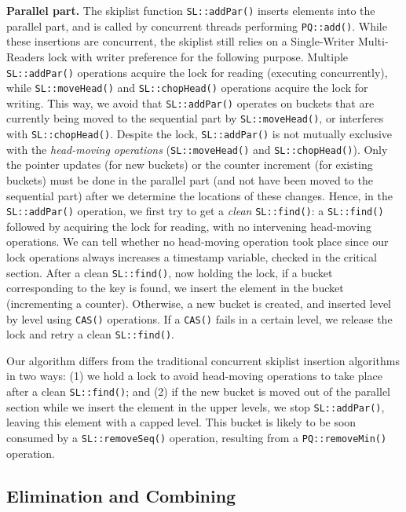 \textbf{Parallel part.} The skiplist function \texttt{SL::addPar()} inserts elements into the parallel part, and is called by concurrent threads performing \texttt{PQ::add()}. While these insertions are concurrent, the skiplist still relies on a Single-Writer Multi-Readers lock with writer preference for the following purpose. Multiple \texttt{SL::addPar()} operations acquire the lock for reading (executing concurrently), while \texttt{SL::moveHead()} and \texttt{SL::chopHead()} operations acquire the lock for writing. This way, we avoid that \texttt{SL::addPar()} operates on buckets that are currently being moved to the sequential part by \texttt{SL::moveHead()}, or interferes with \texttt{SL::chopHead()}.
Despite the lock, \texttt{SL::addPar()} is not mutually exclusive with the \emph{head-moving operations} (\texttt{SL::moveHead()} and \texttt{SL::chopHead()}). Only the pointer updates (for new buckets) or the counter increment (for existing buckets) must be done in the parallel part (and not have been moved to the sequential part) after we determine the locations of these changes.
Hence, in the \texttt{SL::addPar()} operation, we first try to get a \emph{clean} \texttt{SL::find()}: a \texttt{SL::find()} followed by acquiring the lock for reading, with no intervening head-moving operations. We can tell whether no head-moving operation took place since our lock operations always increases a timestamp variable, checked in the critical section. After a clean \texttt{SL::find()}, now holding the lock, if a bucket corresponding to the key is found, we insert the element in the bucket (incrementing a counter). Otherwise, a new bucket is created, and inserted level by level using \texttt{CAS()} operations. If a \texttt{CAS()} fails in a certain level, we release the lock and retry a clean \texttt{SL::find()}.

Our algorithm differs from the traditional concurrent skiplist insertion algorithms in two ways: (1) we hold a lock to avoid head-moving operations to take place after a clean \texttt{SL::find()}; and (2) if the new bucket is moved out of the parallel section while we insert the element in the upper levels, we stop \texttt{SL::addPar()}, leaving this element with a capped level. This bucket is likely to be soon consumed by a \texttt{SL::removeSeq()} operation, resulting from a \texttt{PQ::removeMin()} operation.

\subsection{Elimination and Combining}
\label{Sec-Design-EliminationCombining}

